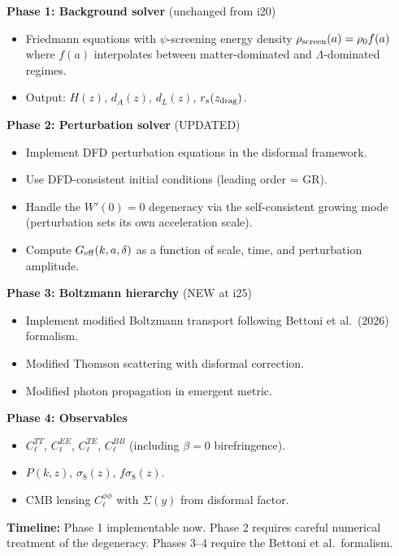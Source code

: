 \documentclass[11pt]{article}
\newcommand{\Geff}{G_{\rm eff}}
\begin{document}
\begin{tcolorbox}[colback=yellow!5!white, colframe=yellow!50!black,
  title=\textbf{mochi\_class v0.3 SPECIFICATION (updated i25)}]

\textbf{Phase 1: Background solver} (unchanged from i20)
\begin{itemize}
  \item Friedmann equations with $\psi$-screening energy density
    $\rho_{\rm screen}(a) = \rho_0 f(a)$ where $f(a)$ interpolates
    between matter-dominated and $\Lambda$-dominated regimes.
  \item Output: $H(z)$, $d_A(z)$, $d_L(z)$, $r_s(z_{\rm drag})$.
\end{itemize}

\textbf{Phase 2: Perturbation solver} (UPDATED)
\begin{itemize}
  \item Implement DFD perturbation equations in the disformal framework.
  \item Use DFD-consistent initial conditions (leading order = GR).
  \item Handle the $W'(0) = 0$ degeneracy via the self-consistent
    growing mode (perturbation sets its own acceleration scale).
  \item Compute $\Geff(k,a,\delta)$ as a function of scale, time,
    and perturbation amplitude.
\end{itemize}

\textbf{Phase 3: Boltzmann hierarchy} (NEW at i25)
\begin{itemize}
  \item Implement modified Boltzmann transport following
    Bettoni et al.\ (2026) formalism.
  \item Modified Thomson scattering with disformal correction.
  \item Modified photon propagation in emergent metric.
\end{itemize}

\textbf{Phase 4: Observables}
\begin{itemize}
  \item $C_\ell^{TT}$, $C_\ell^{EE}$, $C_\ell^{TE}$, $C_\ell^{BB}$
    (including $\beta = 0$ birefringence).
  \item $P(k,z)$, $\sigma_8(z)$, $f\sigma_8(z)$.
  \item CMB lensing $C_\ell^{\phi\phi}$ with $\Sigma(y)$ from
    disformal factor.
\end{itemize}

\textbf{Timeline:} Phase 1 implementable now. Phase 2 requires
careful numerical treatment of the degeneracy. Phases 3--4 require
the Bettoni et al.\ formalism.

\end{tcolorbox}
\end{document}
